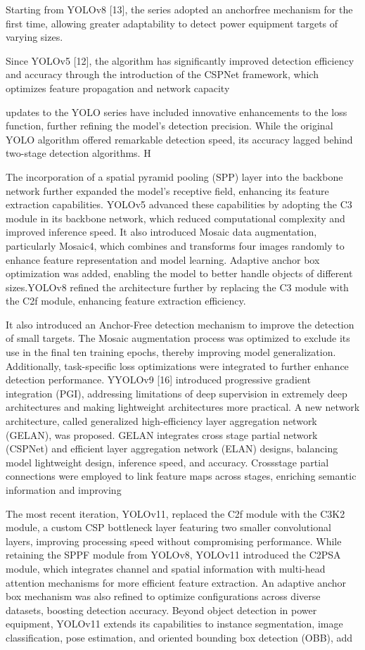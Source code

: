\documentclass[a4paper,10pt,twocolumn]{article}
\numberwithin{figure}{section}
\numberwithin{table}{section}
\begin{document}
Starting from YOLOv8 [13], the series adopted an 
anchorfree mechanism for the first time, allowing 
greater adaptability to detect power equipment 
targets of varying sizes.

Since YOLOv5 [12], the
algorithm has significantly improved detection efficiency and
accuracy through the introduction of the CSPNet framework,
which optimizes feature propagation and network capacity

updates to the YOLO series have included
innovative enhancements to the loss function, further refining
the model’s detection precision. While the original YOLO
algorithm offered remarkable detection speed, its accuracy
lagged behind two-stage detection algorithms. H

The incorporation of a spatial
pyramid pooling (SPP) layer into the backbone network further
expanded the model’s receptive field, enhancing its feature
extraction capabilities. YOLOv5 advanced these capabilities
by adopting the C3 module in its backbone network, which
reduced computational complexity and improved inference
speed. It also introduced Mosaic data augmentation, particularly Mosaic4, which combines and transforms four images
randomly to enhance feature representation and model learning. Adaptive anchor box optimization was added, enabling
the model to better handle objects of different sizes.YOLOv8
refined the architecture further by replacing the C3 module
with the C2f module, enhancing feature extraction efficiency.

It also introduced an Anchor-Free detection mechanism to
improve the detection of small targets. The Mosaic augmentation process was optimized to exclude its use in the final
ten training epochs, thereby improving model generalization.
Additionally, task-specific loss optimizations were integrated
to further enhance detection performance. YYOLOv9 [16] introduced progressive gradient integration (PGI), addressing
limitations of deep supervision in extremely deep architectures and making lightweight architectures more practical. A
new network architecture, called generalized high-efficiency
layer aggregation network (GELAN), was proposed. GELAN
integrates cross stage partial network (CSPNet) and efficient
layer aggregation network (ELAN) designs, balancing model
lightweight design, inference speed, and accuracy. Crossstage partial connections were employed to link feature maps
across stages, enriching semantic information and improving


The most recent iteration, YOLOv11, replaced the
C2f module with the C3K2 module, a custom CSP bottleneck
layer featuring two smaller convolutional layers, improving
processing speed without compromising performance. While
retaining the SPPF module from YOLOv8, YOLOv11 introduced the C2PSA module, which integrates channel and spatial
information with multi-head attention mechanisms for more
efficient feature extraction. An adaptive anchor box mechanism was also refined to optimize configurations across diverse
datasets, boosting detection accuracy. Beyond object detection
in power equipment, YOLOv11 extends its capabilities to
instance segmentation, image classification, pose estimation,
and oriented bounding box detection (OBB), add
\end{document}
